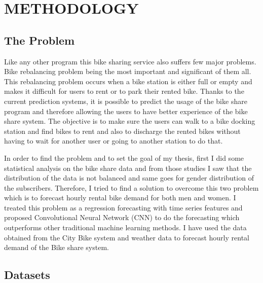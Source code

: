 %
%
%


\chapter{\uppercase{Methodology}}



\section {The Problem}
Like any other program this bike sharing service also suffers few major problems. Bike rebalancing problem being the most important and significant of them all. This rebalancing problem occurs when a bike station is either full or empty and makes it difficult for users to rent or to park their rented bike. Thanks to the current prediction systems, it is possible to predict the usage of the bike share program and therefore allowing the users to have better experience of the bike share system. The objective is to make sure the users can walk to a bike docking station and find bikes to rent and also to discharge the rented bikes without having to wait for another user or going to another station to do that.

In order to find the problem and to set the goal of my thesis, first I did some statistical analysis on the bike share data and from those studies I saw that the distribution of the data is not balanced and same goes for gender distribution of the subscribers. Therefore, I tried to find a solution to overcome this two problem which is to forecast hourly rental bike demand for both men and women. I treated this problem as a regression forecasting with time series features and proposed Convolutional Neural Network (CNN) to do the forecasting which outperforms other traditional machine learning methods. I have used the data obtained from the City Bike system and weather data to forecast hourly rental demand of the Bike share system. 

\section{Datasets}

